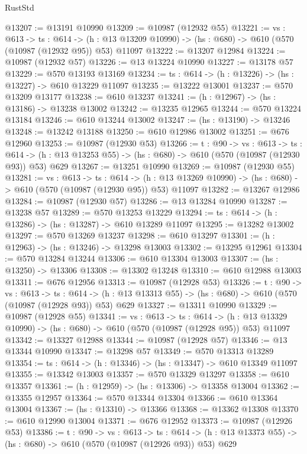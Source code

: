 \begin{lexlean}{RustStd}
\begin{coremodule}
@13207 := @13191 @10990
@13209 := @10987 (@12932 @55)
@13221 := {vs : @613} ->
  {ts : @614} ->
  (h : @13 @13209 @10990) -> (hs : @680) -> @610 (@570 (@10987 (@12932 @95)) @53) @11097
@13222 := @13207 @12984
@13224 := @10987 (@12932 @57)
@13226 := @13 @13224 @10990
@13227 := @13178 @57
@13229 := @570 @13193 @13169
@13234 := {ts : @614} -> (h : @13226) -> (hs : @13227) -> @610 @13229 @11097
@13235 := @13222 @13001
@13237 := @570 @13209 @13177
@13238 := @610 @13237
@13241 := (h : @12967) -> (hs : @13186) -> @13238 @13002
@13242 := @13235 @12965
@13244 := @570 @13224 @13184
@13246 := @610 @13244 @13002
@13247 := (hs : @13190) -> @13246
@13248 := @13242 @13188
@13250 := @610 @12986 @13002
@13251 := @676 @12960
@13253 := @10987 (@12930 @53)
@13266 := {t : @90} ->
  {vs : @613} ->
  {ts : @614} -> (h : @13 @13253 @55) -> (hs : @680) -> @610 (@570 (@10987 (@12930 @93)) @53) @629
@13267 := @13251 @10990
@13269 := @10987 (@12930 @55)
@13281 := {vs : @613} ->
  {ts : @614} ->
  (h : @13 @13269 @10990) -> (hs : @680) -> @610 (@570 (@10987 (@12930 @95)) @53) @11097
@13282 := @13267 @12986
@13284 := @10987 (@12930 @57)
@13286 := @13 @13284 @10990
@13287 := @13238 @57
@13289 := @570 @13253 @13229
@13294 := {ts : @614} -> (h : @13286) -> (hs : @13287) -> @610 @13289 @11097
@13295 := @13282 @13002
@13297 := @570 @13269 @13237
@13298 := @610 @13297
@13301 := (h : @12963) -> (hs : @13246) -> @13298 @13003
@13302 := @13295 @12961
@13304 := @570 @13284 @13244
@13306 := @610 @13304 @13003
@13307 := (hs : @13250) -> @13306
@13308 := @13302 @13248
@13310 := @610 @12988 @13003
@13311 := @676 @12956
@13313 := @10987 (@12928 @53)
@13326 := {t : @90} ->
  {vs : @613} ->
  {ts : @614} -> (h : @13 @13313 @55) -> (hs : @680) -> @610 (@570 (@10987 (@12928 @93)) @53) @629
@13327 := @13311 @10990
@13329 := @10987 (@12928 @55)
@13341 := {vs : @613} ->
  {ts : @614} ->
  (h : @13 @13329 @10990) -> (hs : @680) -> @610 (@570 (@10987 (@12928 @95)) @53) @11097
@13342 := @13327 @12988
@13344 := @10987 (@12928 @57)
@13346 := @13 @13344 @10990
@13347 := @13298 @57
@13349 := @570 @13313 @13289
@13354 := {ts : @614} -> (h : @13346) -> (hs : @13347) -> @610 @13349 @11097
@13355 := @13342 @13003
@13357 := @570 @13329 @13297
@13358 := @610 @13357
@13361 := (h : @12959) -> (hs : @13306) -> @13358 @13004
@13362 := @13355 @12957
@13364 := @570 @13344 @13304
@13366 := @610 @13364 @13004
@13367 := (hs : @13310) -> @13366
@13368 := @13362 @13308
@13370 := @610 @12990 @13004
@13371 := @676 @12952
@13373 := @10987 (@12926 @53)
@13386 := {t : @90} ->
  {vs : @613} ->
  {ts : @614} -> (h : @13 @13373 @55) -> (hs : @680) -> @610 (@570 (@10987 (@12926 @93)) @53) @629

\end{coremodule}
\end{lexlean}
